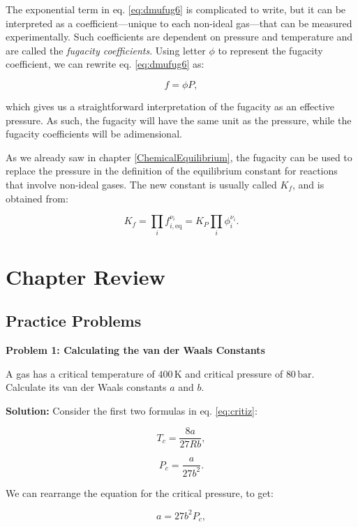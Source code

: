 \documentclass[
  9pt,
]{extbook}
\theoremstyle{definition}
\theoremstyle{definition}
\theoremstyle{definition}
\theoremstyle{definition}
\theoremstyle{remark}
\begin{document}
The exponential term in eq. \eqref{eq:dmufug6} is complicated to write, but it can be interpreted as a coefficient---unique to each non-ideal gas---that can be measured experimentally. Such coefficients are dependent on pressure and temperature and are called the \emph{fugacity coefficients}. Using letter \(\phi\) to represent the fugacity coefficient, we can rewrite eq. \eqref{eq:dmufug6} as:

\begin{equation}
f = \phi P,
\label{eq:dmufug7}
\end{equation}

which gives us a straightforward interpretation of the fugacity as an effective pressure. As such, the fugacity will have the same unit as the pressure, while the fugacity coefficients will be adimensional.

As we already saw in chapter \ref{ChemicalEquilibrium}, the fugacity can be used to replace the pressure in the definition of the equilibrium constant for reactions that involve non-ideal gases. The new constant is usually called \(K_f\), and is obtained from:

\begin{equation}
K_f=\prod_i f_{i,\text{eq}}^{\nu_i} = K_P \prod_i \phi_{i}^{\nu_i}.
\label{eq:kfdef}
\end{equation}

\section{Chapter Review}\label{rev11}

\subsection{Practice Problems}\label{exer11}

\textbf{Problem 1: Calculating the van der Waals Constants}

A gas has a critical temperature of \(400\,\text{K}\) and critical pressure of \(80\,\text{bar}\). Calculate its van der Waals constants \(a\) and \(b\).

\textbf{Solution:} Consider the first two formulas in eq. \eqref{eq:critiz}:

\[T_c = \frac{8a}{27Rb},\]

\[P_c = \frac{a}{27b^2}.\]

We can rearrange the equation for the critical pressure, to get:

\[a = 27b^2P_c,\]
\end{document}
